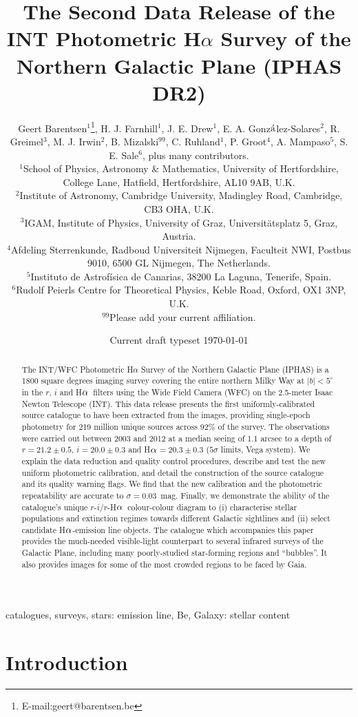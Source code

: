 \documentclass[useAMS,usenatbib]{mn2e}
\title[IPHAS Data Release 2]{The Second Data Release 
of the INT Photometric H$\alpha$ Survey 
of the Northern Galactic Plane (IPHAS DR2)}
\author[G. Barentsen
et. al]{Geert Barentsen$^{1}$\thanks{E-mail:geert@barentsen.be},
H. J. Farnhill$^1$,
J. E. Drew$^1$,
E. A. Gonz$\acute{\rm{a}}$lez-Solares$^2$, \newauthor
R. Greimel$^3$,
M. J. Irwin$^2$,
B. Mizalski$^{99}$,
C. Ruhland$^1$,
P. Groot$^4$,
A. Mampaso$^5$, \newauthor
S. E. Sale$^6$,
plus many contributors.
\newauthor\\
$^{1}$School of Physics, Astronomy \& Mathematics, University of Hertfordshire, College Lane, Hatfield, Hertfordshire, AL10 9AB, U.K.\\
$^{2}$Institute of Astronomy, Cambridge University, Madingley Road, Cambridge, CB3 OHA, U.K.\\
$^{3}$IGAM, Institute of Physics, University of Graz, Universit\"atsplatz 5, Graz, Austria.\\
$^{4}$Afdeling Sterrenkunde, Radboud Universiteit Nijmegen, Faculteit NWI, Postbus 9010, 6500 GL Nijmegen, The Netherlands.\\
$^{5}$Instituto de Astrof\'isica de Canarias, 38200 La Laguna, Tenerife, Spain.\\
$^{6}$Rudolf Peierls Centre for Theoretical Physics, Keble Road, Oxford, OX1 3NP, U.K.\\
$^{99}$Please add your current affiliation.\\
}
\def\ha{\mbox{H$\rm \alpha$}}
\begin{document}
\date{Current draft typeset \today}
\pagerange{\pageref{firstpage}--\pageref{lastpage}} 

\maketitle

\label{firstpage}

\begin{abstract} %
The INT/WFC Photometric H$\alpha$ Survey 
of the Northern Galactic Plane (IPHAS)
is a 1800 square degrees imaging survey
covering the entire northern Milky Way at $|b| < 5^\circ$
in the $r$, $i$ and \ha\ filters 
using the Wide Field Camera (WFC) 
on the 2.5-meter Isaac Newton Telescope (INT).
This data release presents the first 
uniformly-calibrated source catalogue
to have been extracted from the images,
providing single-epoch photometry
for 219 million unique sources
across 92\% of the survey.
The observations were carried out between 2003 and 2012
at a median seeing of 1.1 arcsec
to a depth of $r=21.2\pm 0.5$, $i=20.0\pm 0.3$ and \ha$=20.3\pm 0.3$
($5\sigma$ limits, Vega system).
We explain the data reduction 
and quality control procedures,
describe and test the new uniform photometric calibration,
and detail the construction of the source catalogue
and its quality warning flags.
We find that the new calibration
and the photometric repeatability are accurate to
$\sigma=0.03$~mag.
Finally, we demonstrate the ability of the 
catalogue's unique
$r$-$i$/$r$-\ha\ colour-colour diagram to
(i) characterise stellar populations and extinction regimes
towards different Galactic sightlines
and (ii) select candidate \ha-emission line objects.
The catalogue which accompanies this paper
provides the much-needed visible-light counterpart
to several infrared surveys of the Galactic Plane,
including many poorly-studied star-forming regions and ``bubbles''.
It also provides images for some of the most
crowded regions to be faced by Gaia.
\end{abstract}

\begin{keywords}
catalogues, surveys, stars: emission line, Be, Galaxy: stellar content
\end{keywords}

\section{Introduction}
\end{document}
